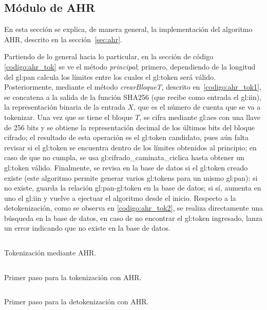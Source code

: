 %
%
%

\subsection{Módulo de AHR}
En esta sección se explica, de manera general, la implementación del algoritmo
AHR, descrito en la sección~\ref{sec:ahr}.

Partiendo de lo general hacia lo particular, en la sección de código
\ref{codigo:ahr_tok} se ve el método \textit{principal}; primero, dependiendo de
la longitud del \gls{gl:pan} calcula los límites entre los cuales el
\gls{gl:token} será válido. Posteriormente, mediante el método
\textit{crearBloqueT}, descrito en~\ref{codigo:ahr_tok1}, se concatena a la
salida de la función SHA256 (que recibe como entrada el \gls{gl:iin}), la
representación binaria de la entrada $X$, que es el número de cuenta que se
va a tokenizar. Una vez que se tiene el bloque $T$, se cifra mediante
\gls{gl:aes} con una llave de 256 bits y se obtiene la representación decimal
de los últimos bits del bloque cifrado; el resultado de esta operación es
el \gls{gl:token} candidato, pues aún falta revisar si el \gls{gl:token} se
encuentra dentro de los límites obtenidos al principio; en caso de que no
cumpla, se usa \gls{gl:cifrado_caminata_ciclica} hasta obtener un \gls{gl:token}
válido. Finalmente, se revisa en la base de datos si el \gls{gl:token} creado
existe (este algoritmo permite generar varios \glspl{gl:token} para un mismo
\gls{gl:pan}): si no existe, guarda la relación \gls{gl:pan}-\gls{gl:token} en
la base de datos; si sí, aumenta en uno el \gls{gl:iin} y vuelve a ejectuar
el algoritmo desde el inicio. Respecto a la detokenización, como se observa en
\ref{codigo:ahr_tok2}, se realiza directamente una búsqueda en la base de datos,
en caso de no encontrar el \gls{gl:token} ingresado, lanza un error indicando
que no existe en la base de datos.

\begin{listing}
  \inputminted[firstline=284, lastline=328]
    {c++}{../implementaciones/ahr/ahr.cpp}
  \caption{Tokenización mediante AHR.}
  \label{codigo:ahr_tok}
\end{listing}

\begin{listing}
  \inputminted[firstline=193, lastline=223]
    {c++}{../implementaciones/ahr/ahr.cpp}
  \caption{Primer paso para la tokenización con AHR.}
  \label{codigo:ahr_tok1}
\end{listing}

\begin{listing}
  \inputminted[firstline=360, lastline=372]
    {c++}{../implementaciones/ahr/ahr.cpp}
  \caption{Primer paso para la detokenización con AHR.}
  \label{codigo:ahr_tok2}
\end{listing}
